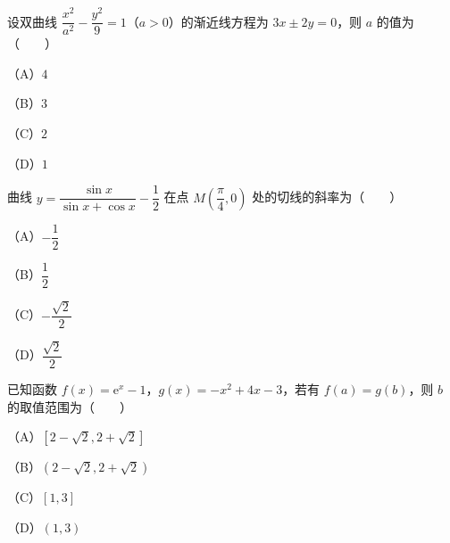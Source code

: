 \begin{question}
设双曲线 $\dfrac{x^2}{a^2}-\dfrac{y^2}9=1$（$a>0$）的渐近线方程为 $3x\pm2y=0$，则 $a$ 的值为\mbox{（　　）}

（A）$4$

（B）$3$

（C）$2$

（D）$1$

\end{question}
\begin{question}
曲线 $y=\dfrac{\sin x}{\sin x+\cos x}-\dfrac12$ 在点 $M\left(\dfrac\pi4,0\right)$ 处的切线的斜率为\mbox{（　　）}

（A）$-\dfrac12$

（B）$\dfrac12$

（C）$-\dfrac{\sqrt2}2$

（D）$\dfrac{\sqrt2}2$

\end{question}
\begin{question}
已知函数 $f(x)=\mathrm e^x-1$，$g(x)=-x^2+4x-3$，若有 $f(a)=g(b)$，则 $b$ 的取值范围为\mbox{（　　）}

（A）$[2-\sqrt2,2+\sqrt2]$

（B）$(2-\sqrt2,2+\sqrt2)$

（C）$[1,3]$

（D）$(1,3)$

\end{question}


